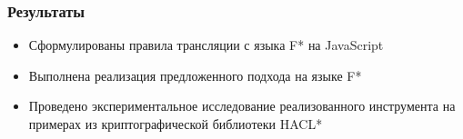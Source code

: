 \documentclass{beamer}
\begin{document}
\begin{frame}
\transwipe[direction=90]
\frametitle{Результаты}

\begin{itemize}
\item Сформулированы правила трансляции с языка F* на JavaScript
\item Выполнена реализация предложенного подхода на языке F*
\item Проведено экспериментальное исследование реализованного инструмента на примерах из криптографической библиотеки HACL*
\end{itemize}
\end{frame}
\end{document}
